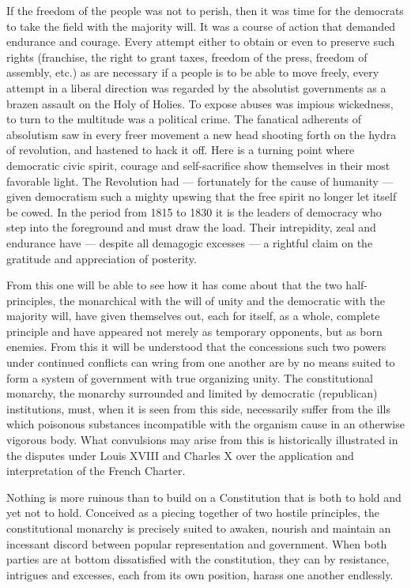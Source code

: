 \documentclass[12pt,a4paper,openany]{book}
\newcommand{\opage}[1]{\marginnote{\footnotesize\textit{[#1]}}}
\begin{document}
If the freedom of the people was not to perish, then it
was time for the democrats to take the field with
the majority will. It was a course of action that demanded
endurance and courage. Every attempt either to
obtain or even to preserve such rights (franchise,
the right to grant taxes, freedom of the press, freedom of assembly, etc.)
as are necessary if a people is to be able to move
freely, every attempt in a liberal direction was regarded by the
absolutist governments as a brazen assault
on the Holy of Holies. To expose abuses was
impious wickedness, to turn to the multitude was a
political crime. The fanatical adherents of absolutism
saw in every freer movement a new head shooting
forth on the hydra of revolution, and hastened to hack
it off. Here is a turning point where democratic civic spirit,
courage and self-sacrifice show themselves in their most favorable
light. The Revolution had --- fortunately for the cause
of humanity --- given democratism such a mighty upswing
that the free spirit no longer let itself be cowed. In the period
from 1815 to 1830 it is the leaders of democracy who step
into the foreground and must draw the load. Their intrepidity,
zeal and endurance have --- despite all
demagogic excesses --- a rightful claim on the gratitude and
appreciation of posterity.

From this one will be able to see how it has come
about that the two half-principles, the monarchical with the will of unity
and the democratic with the majority will, have
\setcounter{footnote}{0}%
\opage{27}given themselves out, each for itself, as a whole, complete principle
and have appeared not merely as temporary opponents,
but as born enemies. From this it will be understood
that the concessions such two powers under continued
conflicts can wring from one another are by no means suited
to form a system of government with true organizing
unity. The constitutional monarchy, the monarchy
surrounded and limited by democratic (republican)
institutions, must, when it is seen from this side,
necessarily suffer from the ills which poisonous substances
incompatible with the organism cause in an otherwise vigorous
body. What convulsions may arise from this
is historically illustrated in the disputes under Louis
XVIII and Charles X over the application and interpretation of
the French Charter.

Nothing is more ruinous than to build on a
Constitution that is both to hold and yet not to hold.
Conceived as a piecing together of two hostile principles,
the constitutional monarchy is precisely suited
to awaken, nourish and maintain an incessant discord
between popular representation and government. When both
parties are at bottom dissatisfied with the constitution, they can
by resistance, intrigues and excesses, each from its own
position, harass one another endlessly.
\end{document}
